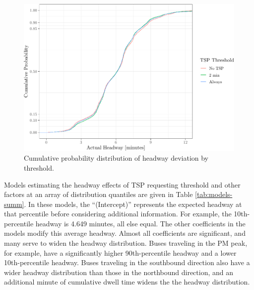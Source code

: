 \documentclass[3p, authoryear, review]{elsarticle} %
\makeatletter
\def\maxwidth{\ifdim\Gin@nat@width>\linewidth\linewidth
\else\Gin@nat@width\fi}
\let\Oldincludegraphics\includegraphics
\renewcommand{\includegraphics}[1]{\Oldincludegraphics[width=\maxwidth]{#1}}
\makeatother
\begin{document}
\begin{figure}
\centering
\includegraphics{uvx_headways_files/figure-latex/ecdf-1.pdf}
\caption{\label{fig:ecdf}Cumulative probability distribution of headway deviation by threshold.}
\end{figure}

Models estimating the headway effects of TSP requesting threshold and other factors
at an array of distribution quantiles are given in Table \ref{tab:models-summ}.
In these models, the ``(Intercept)'' represents the expected headway at that percentile
before considering additional information. For example, the 10th-percentile headway
is 4.649 minutes, all else equal. The other
coefficients in the models modify this average headway. Almost all coefficients are
significant, and many serve to widen the headway distribution.
Buses traveling in the PM peak, for example, have a significantly higher
90th-percentile headway and a lower 10th-percentile headway. Buses traveling in the
southbound direction also have a wider headway distribution than those in the
northbound direction, and an additional minute of cumulative dwell time widens the
the headway distribution.
\end{document}
